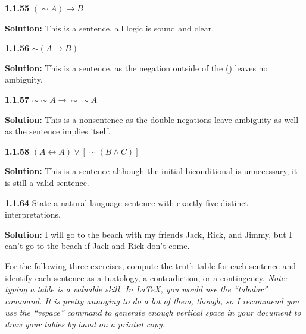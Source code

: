 \documentclass[12pt]{article}
\begin{document}
\singlespacing
\vspace{12pt}

\noindent\textbf{1.1.55} $(\sim A)\rightarrow B$

\doublespacing
\textbf{Solution:} This is a sentence, all logic is sound and clear.


\singlespacing
\vspace{12pt}

\noindent\textbf{1.1.56} $\sim(A\rightarrow B)$

\doublespacing
\textbf{Solution:} This is a sentence, as the negation outside of the () leaves no ambiguity.

\singlespacing
\vspace{12pt}

\noindent\textbf{1.1.57} $\sim\sim A\rightarrow\sim\sim A$

\doublespacing
\textbf{Solution:} This is a nonsentence as the double negations leave ambiguity as well as the sentence implies itself.

\newpage

\singlespacing
\vspace{12pt}

\noindent\textbf{1.1.58} $(A\leftrightarrow A)\vee[\sim(B\wedge C)]$

\doublespacing
\textbf{Solution:} This is a sentence although the initial biconditional is unnecessary, it is still a valid sentence.

\singlespacing
\vspace{12pt}

\noindent\textbf{1.1.64} State a natural language sentence with exactly five distinct interpretations.

\doublespacing
\textbf{Solution:} I will go to the beach with my friends Jack, Rick, and Jimmy, but I can't go to the beach if Jack and Rick don't come.


\singlespacing
\vspace{12pt}
\newpage

For the following three exercises, compute the truth table for each sentence and identify each sentence as a tuatology, a contradiction, or a contingency. \textit{Note: typing a table is a valuable skill.  In \LaTeX, you would use the ``tabular'' command.  It is pretty annoying to do a lot of them, though, so I recommend you use the ``vspace'' command to generate enough vertical space in your document to draw your tables by hand on a printed copy.}

\vspace{12pt}
\end{document}

